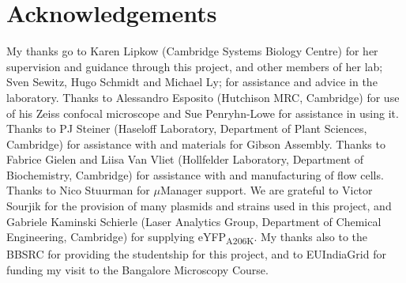 \documentclass[../main.tex]{subfiles}
\begin{document}
\section*{Acknowledgements}

My thanks go to Karen Lipkow (Cambridge Systems Biology Centre) for her supervision and guidance through this project, and other members of her lab; Sven Sewitz, Hugo Schmidt and Michael Ly; for assistance and advice in the laboratory. Thanks to Alessandro Esposito (Hutchison MRC, Cambridge) for use of his Zeiss confocal microscope and Sue Penryhn-Lowe for assistance in using it. Thanks to PJ Steiner (Haseloff Laboratory, Department of Plant Sciences, Cambridge) for assistance with and materials for Gibson Assembly. Thanks to Fabrice Gielen and Liisa Van Vliet (Hollfelder Laboratory, Department of Biochemistry, Cambridge) for assistance with and manufacturing of flow cells. Thanks to Nico Stuurman for \(\mu\)Manager support. We are grateful to Victor Sourjik for the provision of many plasmids and strains used in this project, and Gabriele Kaminski Schierle (Laser Analytics Group, Department of Chemical Engineering, Cambridge) for supplying eYFP\textsubscript{A206K}. My thanks also to the BBSRC for providing the studentship for this project, and to EUIndiaGrid for funding my visit to the Bangalore Microscopy Course.
\end{document}
